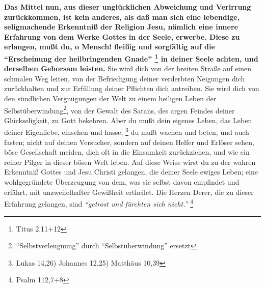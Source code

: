\textbf{Das Mittel nun, aus dieser unglücklichen Abweichung und Verirrung zurückkommen,
ist kein anderes, als daß man sich eine lebendige, seligmachende Erkenntniß der
Religion Jesu, nämlich eine innere Erfahrung von dem Werke Gottes in der Seele,
erwerbe. Diese zu erlangen, mußt du, o Mensch! fleißig und sorgfältig auf die 
"`Erscheinung der heilbringenden Gnade"'
\footnote{Titus 2,11+12}
in deiner Seele
achten, und derselben Gehorsam leisten.} Sie wird dich von der breiten Straße auf
einen schmalen Weg leiten, von der Befriedigung deiner verderbten Neigungen dich
zurückhalten und zur Erfüllung deiner Pflichten dich antreiben. Sie wird dich
von den sündlichen Vergnügungen der Welt zu einem heiligen Leben der
Selbstüberwindung\footnote{"`Selbstverleugnung"' durch "`Selbstüberwindung"' ersetzt}, von der Gewalt des Satans, des argen Feindes deiner
Glückseligkeit, zu Gott bekehren. Aber du mußt dein eigenes Leben, das Leben
deiner Eigenliebe, einsehen und hasse;
\footnote{Lukas 14,26) Johannes 12,25) Matthäus 10,39}
du mußt wachen und beten, und auch fasten; nicht auf deinen Versucher,
sondern auf deinen Helfer und Erlöser sehen, böse Gesellschaft meiden, dich oft
in die Einsamkeit zurückziehen, und wie ein reiner Pilger in dieser bösen Welt
leben. Auf diese Weise wirst du zu der wahren Erkenntniß Gottes und Jesu Christi
gelangen, die deiner Seele ewiges Leben; eine wohlgegründete Überzeugung von
dem, was sie selbst davon empfindet und erfährt, mit unzweifelhafter Gewißheit
ertheilet. Die Herzen Derer, die zu dieser Erfahrung gelangen, sind
\textit{"`getrost und fürchten sich nicht."'}
\footnote{Psalm 112,7+8}
